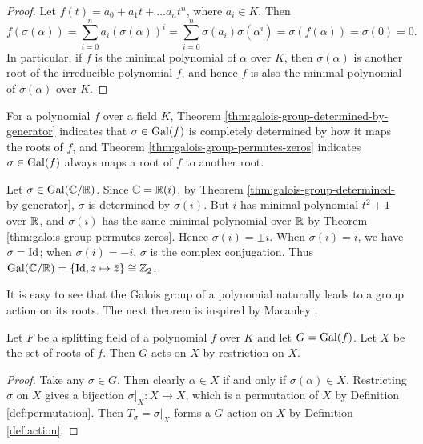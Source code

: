 \begin{proof}
	Let $f(t) = a_0 + a_1 t + \dots a_n t^n$, where $a_i \in K$. Then $$f(\sigma(\alpha)) = \sum_{i=0}^n a_i \left( \sigma (\alpha) \right)^i
	= \sum_{i=0}^n \sigma(a_i)  \sigma (\alpha ^ i) 
	= \sigma(f(\alpha)) = \sigma(0) = 0. $$
	In particular, if $f$ is the minimal polynomial of $\alpha$ over $K$, then $\sigma(\alpha)$ is another root of the irreducible polynomial $f$, and hence $f$ is also the minimal polynomial of $\sigma(\alpha)$ over $K$. 
\end{proof}



For a polynomial $f$ over a field $K$, Theorem \ref{thm:galois-group-determined-by-generator} indicates that $\sigma \in \operatorname{Gal}(f)$ is completely determined by how it maps the roots of $f$, and Theorem \ref{thm:galois-group-permutes-zeros} indicates $\sigma \in \operatorname{Gal}(f)$ always maps a root of $f$ to another root.

\begin{example}
	Let $\sigma \in \operatorname{Gal}(\mathbb C/\mathbb R)$. Since $\mathbb C= \mathbb R(i)$, by Theorem \ref{thm:galois-group-determined-by-generator}, $\sigma$ is determined by $\sigma(i)$. But $i$ has minimal polynomial $t^2 + 1$ over $\mathbb R$, and $\sigma(i)$ has the same minimal polynomial over $\mathbb R$ by Theorem \ref{thm:galois-group-permutes-zeros}. Hence $\sigma(i) = \pm i$. When $\sigma(i) = i$, we have $\sigma = \operatorname{Id}$; when $\sigma(i) = -i$, $\sigma$ is the complex conjugation. Thus $\operatorname{Gal}(\mathbb C / \mathbb R) = \{\operatorname{Id}, z \mapsto \bar z \} \cong \mathbb Z_2$. 
\end{example}

It is easy to see that the Galois group of a polynomial naturally leads to a group action on its roots. The next theorem is inspired by Macauley \cite{visual-algebra}. 


\begin{theorem} \label{thm:galois-group-acts-on-zeros}
	Let $F$ be a splitting field of a polynomial $f$ over $K$ and let $G = \operatorname{Gal}(f)$. Let $X$ be the set of roots of $f$. Then $G$ acts on $X$ by restriction on $X$. 
\end{theorem}

\begin{proof}
	Take any $\sigma \in G$. Then clearly $\alpha \in X$ if and only if $\sigma(\alpha) \in X$. Restricting $\sigma$ on $X$ gives a bijection $\sigma | _X : X \to X$, which is a permutation of $X$ by Definition \ref{def:permutation}. Then $T_\sigma  = \sigma | _X$ forms a $G$-action on $X$ by Definition \ref{def:action}.  
\end{proof}


